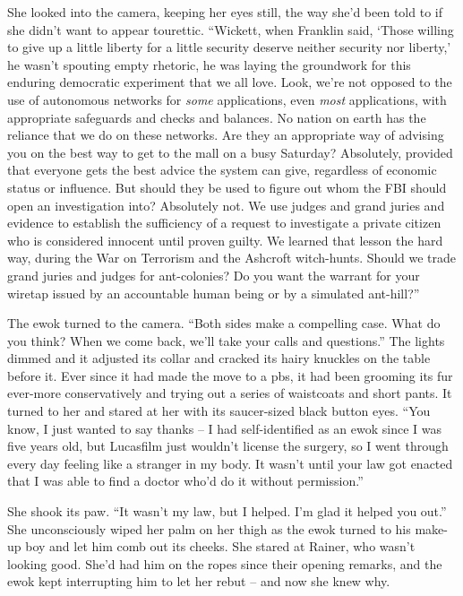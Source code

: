 She looked into the camera, keeping her eyes still, the way she'd been 
told to if she didn't want to appear tourettic. “Wickett, when 
Franklin said, `Those willing to give up a little liberty for a little 
security deserve neither security nor liberty,' he wasn't spouting 
empty rhetoric, he was laying the groundwork for this enduring 
democratic experiment that we all love. Look, we're not opposed to the 
use of autonomous networks for \emph{some} applications, even 
\emph{most} applications, with appropriate safeguards and checks and 
balances. No nation on earth has the reliance that we do on these 
networks. Are they an appropriate way of advising you on the best way 
to get to the mall on a busy Saturday? Absolutely, provided that 
everyone gets the best advice the system can give, regardless of 
economic status or influence. But should they be used to figure out 
whom the FBI should open an investigation into? Absolutely not. We use 
judges and grand juries and evidence to establish the sufficiency of a 
request to investigate a private citizen who is considered innocent 
until proven guilty. We learned that lesson the hard way, during the 
War on Terrorism and the Ashcroft witch-hunts. Should we trade grand 
juries and judges for ant-colonies? Do you want the warrant for your 
wiretap issued by an accountable human being or by a simulated 
ant-hill?”

The ewok turned to the camera. “Both sides make a compelling case. 
What do you think? When we come back, we'll take your calls and 
questions.” The lights dimmed and it adjusted its collar and cracked 
its hairy knuckles on the table before it. Ever since it had made the 
move to a pbs, it had been grooming its fur ever-more conservatively 
and trying out a series of waistcoats and short pants. It turned to her 
and stared at her with its saucer-sized black button eyes. “You know, 
I just wanted to say thanks -- I had self-identified as an ewok since I 
was five years old, but Lucasfilm just wouldn't license the surgery, so 
I went through every day feeling like a stranger in my body. It wasn't 
until your law got enacted that I was able to find a doctor who'd do it 
without permission.”

She shook its paw. “It wasn't my law, but I helped. I'm glad it 
helped you out.” She unconsciously wiped her palm on her thigh as the 
ewok turned to his make-up boy and let him comb out its cheeks. She 
stared at Rainer, who wasn't looking good. She'd had him on the ropes 
since their opening remarks, and the ewok kept interrupting him to let 
her rebut -- and now she knew why.

